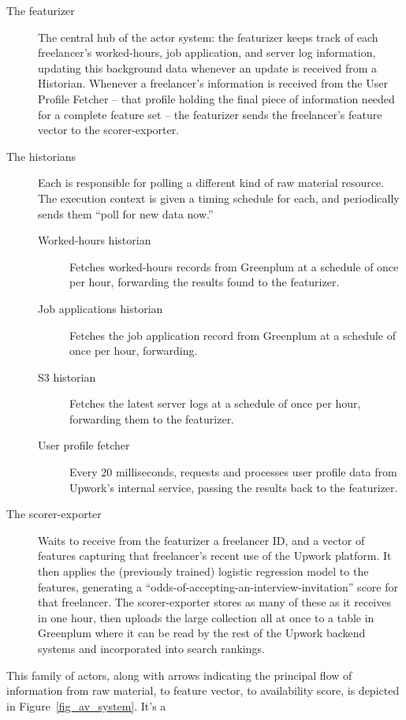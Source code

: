 \documentclass{article}
\begin{document}
\begin{description}
\item[The featurizer] The central hub of the actor system: the featurizer keeps track of
each freelancer's worked-hours, job application, and server log information,
updating this background data whenever an update is received from a Historian.
Whenever a freelancer's information is received from the User Profile Fetcher -- that 
profile holding the final piece of information needed for a complete feature set --
the featurizer sends the freelancer's feature vector to the scorer-exporter.

\item[The historians] Each is responsible for polling a different kind of raw
material resource. The execution context is given a timing schedule for
each, and periodically sends them ``poll for new data now.''
	\begin{description}
	\item[Worked-hours historian] Fetches worked-hours records from 
	Greenplum at a schedule of once per hour, forwarding the results found
	to the featurizer.
	\item[Job applications historian] Fetches the job application record from
	Greenplum at a schedule of once per hour, forwarding.
	\item[S3 historian] Fetches the latest server logs at a schedule of once per hour,
	forwarding them to the featurizer.
	\item[User profile fetcher] Every 20 milliseconds, requests and processes user 
	profile data from Upwork's internal service, passing the results back to the featurizer.
	\end{description}

\item[The scorer-exporter] Waits to receive from the featurizer  a freelancer ID, and a
vector of features capturing that freelancer's recent use of the Upwork platform.
It then applies the (previously trained) logistic regression model to the features,
generating a ``odds-of-accepting-an-interview-invitation'' score for that freelancer.
The scorer-exporter stores as many of these as it receives in one hour, then
uploads the large collection all at once to a table in Greenplum where it can be
read by the rest of the Upwork backend systems and incorporated into search
rankings.

\end{description}

This family of actors, along with arrows indicating the principal flow of information 
from raw material, to feature vector, to availability score, is depicted in
Figure~\ref{fig_av_system}. It's a 
\end{document}
